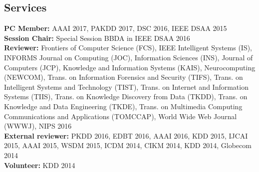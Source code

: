 \documentclass[margin, 10pt]{res}
\begin{document}
\begin{resume}

\section{Services}

{\bf PC Member:} AAAI 2017, PAKDD 2017, DSC 2016, IEEE DSAA 2015 \\
{\bf Session Chair:} Special Session BBDA in IEEE DSAA 2016 \\
{\bf Reviewer:}
Frontiers of Computer Science (FCS),
IEEE Intelligent Systems (IS),
INFORMS Journal on Computing (JOC),
Information Sciences (INS),
Journal of Computers (JCP),
Knowledge and Information Systems (KAIS),
Neurocomputing (NEWCOM),
Trans. on Information Forensics and Security (TIFS),
Trans. on Intelligent Systems and Technology (TIST),
Trans. on Internet and Information Systems (TIIS),
Trans. on Knowledge Discovery from Data (TKDD),
Trans. on Knowledge and Data Engineering (TKDE),
Trans. on Multimedia Computing Communications and Applications (TOMCCAP),
World Wide Web Journal (WWWJ), NIPS 2016 \\
{\bf External reviewer:} PKDD 2016, EDBT 2016, AAAI 2016, KDD 2015, IJCAI 2015, AAAI 2015,
WSDM 2015, ICDM 2014, CIKM 2014, KDD 2014, Globecom 2014 \\
{\bf Volunteer:} KDD 2014

\end{resume}
\end{document}
